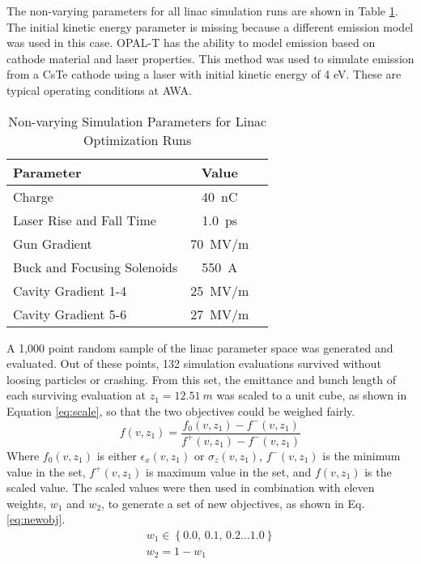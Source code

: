 \documentclass[letterpaper,  %
              ]{jacow}
\begin{document}
The non-varying parameters for all 
linac simulation runs are shown in Table \ref{tab:linac}.
The initial kinetic energy parameter is missing because a different
emission model was used in this case. OPAL-T has the 
ability to model emission based on cathode material and laser
properties. This method was used to simulate emission
from a CsTe cathode using a laser with initial kinetic energy of 4 eV. 
These are typical operating conditions at AWA. 
\begin{table}[hbt] %
	\centering
	\begin{tabular}{l c c}
		\textbf{Parameter} & \textbf{Value} \\
		\hline %
		Charge  & \SI{40}{nC} \\
		Laser Rise and Fall Time & \SI{1.0}{ps} \\
		Gun Gradient & \SI{70}{MV/m} \\
		Buck and Focusing Solenoids & \SI{550}{A}\\
		Cavity Gradient 1-4 & \SI{25}{MV/m} \\
		Cavity Gradient 5-6 & \SI{27}{MV/m} \\
		
	\end{tabular}
	\caption{Non-varying Simulation Parameters for Linac Optimization Runs}
	\label{tab:linac}
\end{table}

A 1,000 point random sample of the linac parameter 
space was generated and evaluated. Out of these points, 132 
simulation evaluations survived without loosing particles
or crashing. From this set, the emittance and bunch length of each 
surviving evaluation at $z_1=\SI{12.51}{m}$ was scaled to a unit cube, 
as shown in Equation \ref{eq:scale}, so
that the two objectives could be weighed fairly. 
\begin{equation}
f(v,z_1) = \frac{f_0(v,z_1)-f^-(v,z_1)}{f^+(v,z_1)-f^-(v,z_1)} 	
\label{eq:scale}
\end{equation}
Where $f_0(v,z_1)$ is either $\epsilon_x(v,z_1)$ or $\sigma_z(v,z_1)$,
$f^-(v,z_1)$ is the minimum value in the set, 
$f^+(v,z_1)$ is maximum value in the set, and $f(v,z_1)$ is the scaled value.  
The scaled values were then used in combination with eleven weights, $w_1$ and $w_2$,
to generate a set of new objectives, as shown in Eq. \ref{eq:newobj}. 
\begin{equation}
\begin{aligned}
	w_1 \in \left\{ 0.0,\,0.1, \,0.2 \ldots 1.0 \right\}\\
	w_2 = 1 - w_1
\end{aligned}
\end{equation} 
 
\end{document}
